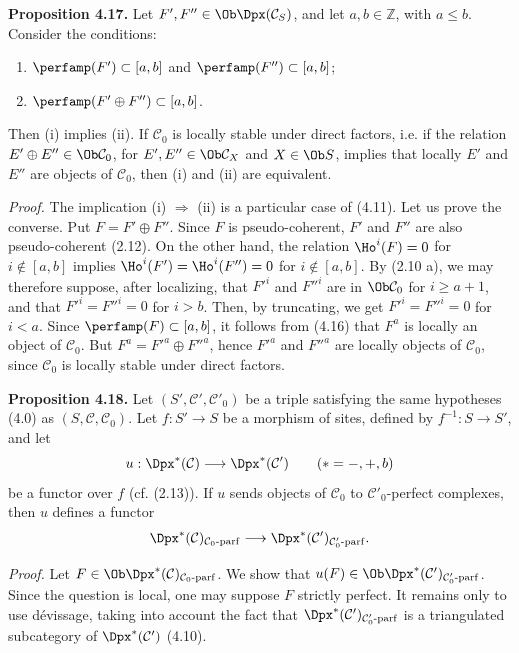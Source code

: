 \documentclass[11pt]{article}
\begin{document}
\textbf{Proposition 4.17.} Let \(F',F''\in\Ob\Dpx(\mathcal C_S)\), and let \(a,b\in\mathbb Z\), with \(a\leq b\). Consider the conditions:
\begin{enumerate}[label=(\roman*)]
\item \(\perfamp(F')\subset[a,b]\) and \(\perfamp(F'')\subset[a,b]\);
\item \(\perfamp(F'\oplus F'')\subset[a,b]\).
\end{enumerate}
Then (i) implies (ii). If \(\mathcal C_0\) is locally stable under direct factors, i.e. if the relation \(E'\oplus E''\in\Ob\mathcal C_0\), for \(E',E''\in\Ob\mathcal C_X\) and \(X\in\Ob S\), implies that locally \(E'\) and \(E''\) are objects of \(\mathcal C_0\), then (i) and (ii) are equivalent.

\emph{Proof.} The implication (i) \(\Rightarrow\) (ii) is a particular case of (4.11). Let us prove the converse. Put \(F=F'\oplus F''\). Since \(F\) is pseudo-coherent, \(F'\) and \(F''\) are also pseudo-coherent (2.12). On the other hand, the relation \(\Ho^i(F)=0\) for \(i\notin[a,b]\) implies \(\Ho^i(F')=\Ho^i(F'')=0\) for \(i\notin[a,b]\). By (2.10 a), we may therefore suppose, after localizing, that \(F'^i\) and \(F''^i\) are in \(\Ob\mathcal C_0\) for \(i\geq a+1\), and that \(F'^i=F''^i=0\) for \(i>b\). Then, by truncating, we get \(F'^i=F''^i=0\) for \(i<a\). Since \(\perfamp(F)\subset[a,b]\), it follows from (4.16) that \(F^a\) is locally an object of \(\mathcal C_0\). But \(F^a=F'^a\oplus F''^a\), hence \(F'^a\) and \(F''^a\) are locally objects of \(\mathcal C_0\), since \(\mathcal C_0\) is locally stable under direct factors.

\textbf{Proposition 4.18.} Let \((S',\mathcal C',\mathcal C'_0)\) be a triple satisfying the same hypotheses (4.0) as \((S,\mathcal C,\mathcal C_0)\). Let \(f:S'\to S\) be a morphism of sites, defined by \(f^{-1}:S\to S'\), and let
\[
  u:\Dpx^*(\mathcal C)\longrightarrow \Dpx^*(\mathcal C')\qquad (*=-,+,b)
\]
be a functor over \(f\) (cf. (2.13)). If \(u\) sends objects of \(\mathcal C_0\) to \(\mathcal C'_0\)-perfect complexes, then \(u\) defines a functor
\[
  \Dpx^*(\mathcal C)_{\mathcal C_0\text{-}\mathrm{parf}}
  \longrightarrow
  \Dpx^*(\mathcal C')_{\mathcal C'_0\text{-}\mathrm{parf}}.
\]

\emph{Proof.} Let \(F\in\Ob\Dpx^*(\mathcal C)_{\mathcal C_0\text{-}\mathrm{parf}}\). We show that \(u(F)\in\Ob\Dpx^*(\mathcal C')_{\mathcal C'_0\text{-}\mathrm{parf}}\). Since the question is local, one may suppose \(F\) strictly perfect. It remains only to use dévissage, taking into account the fact that \(\Dpx^*(\mathcal C')_{\mathcal C'_0\text{-}\mathrm{parf}}\) is a triangulated subcategory of \(\Dpx^*(\mathcal C')\) (4.10).
\end{document}
